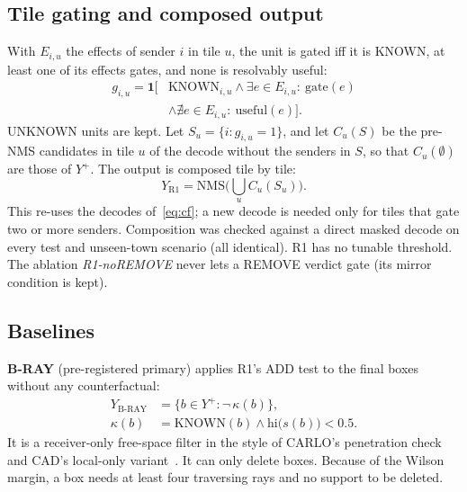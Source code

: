 \documentclass[conference]{IEEEtran}
\begin{document}
\subsection{Tile gating and composed output}
With $E_{i,u}$ the effects of sender $i$ in tile $u$, the unit is gated iff it is KNOWN, at least one of its
effects gates, and none is resolvably useful:
\begin{equation}
\begin{split}
g_{i,u}=\mathbf{1}\big[&\mathrm{KNOWN}_{i,u}\land \exists e{\in}E_{i,u}{:}\ \mathrm{gate}(e)\\
&\land \nexists e{\in}E_{i,u}{:}\ \mathrm{useful}(e)\big].
\end{split}
\label{eq:unitgate}
\end{equation}
UNKNOWN units are kept. Let $S_u=\{i: g_{i,u}=1\}$, and let $C_u(S)$ be the pre-NMS candidates in tile $u$ of the
decode without the senders in $S$, so that $C_u(\emptyset)$ are those of $Y^{+}$. The output is composed tile by
tile:
\begin{equation}
Y_{\mathrm{R1}}=\mathrm{NMS}\Big(\textstyle\bigcup_{u} C_u(S_u)\Big).
\label{eq:compose}
\end{equation}
This re-uses the decodes of~\eqref{eq:cf}; a new decode is needed only for tiles that gate two or more senders.
Composition was checked against a direct masked decode on every test and unseen-town scenario (all identical).
R1 has no tunable threshold. The ablation \emph{R1-noREMOVE} never lets a REMOVE verdict gate (its mirror
condition is kept).

\subsection{Baselines}
\textbf{B-RAY} (pre-registered primary) applies R1's ADD test to the final boxes without any counterfactual:
\begin{equation}
\begin{split}
Y_{\mathrm{B\text{-}RAY}}&=\{b\in Y^{+} : \lnot\,\kappa(b)\},\\
\kappa(b)&=\mathrm{KNOWN}(b)\land \mathrm{hi}\big(s(b)\big)<0.5.
\end{split}
\label{eq:bray}
\end{equation}
It is a receiver-only free-space filter in the style of CARLO's penetration check and CAD's local-only
variant~\cite{sun2020carlo,zhang2024cad}. It can only delete boxes. Because of the Wilson margin, a box needs at
least four traversing rays and no support to be deleted.
\end{document}
